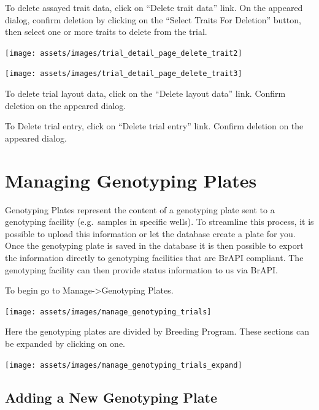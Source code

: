\documentclass[
  12pt,
]{book}
\begin{document}
To delete assayed trait data, click on ``Delete trait data'' link. On the appeared dialog, confirm deletion by clicking on the ``Select Traits For Deletion'' button, then select one or more traits to delete from the trial.

\begin{center}\texttt{[image: assets/images/trial\_detail\_page\_delete\_trait2]} \end{center}

\begin{center}\texttt{[image: assets/images/trial\_detail\_page\_delete\_trait3]} \end{center}

To delete trial layout data, click on the ``Delete layout data'' link. Confirm deletion on the appeared dialog.

To Delete trial entry, click on ``Delete trial entry'' link. Confirm deletion on the appeared dialog.

\hypertarget{managing-genotyping-plates}{%
\chapter{Managing Genotyping Plates}\label{managing-genotyping-plates}}

Genotyping Plates represent the content of a genotyping plate sent to a genotyping facility (e.g.~samples in specific wells). To streamline this process, it is possible to upload this information or let the database create a plate for you. Once the genotyping plate is saved in the database it is then possible to export the information directly to genotyping facilities that are BrAPI compliant. The genotyping facility can then provide status information to us via BrAPI.

To begin go to Manage-\textgreater Genotyping Plates.

\begin{center}\texttt{[image: assets/images/manage\_genotyping\_trials]} \end{center}

Here the genotyping plates are divided by Breeding Program. These sections can be expanded by clicking on one.

\begin{center}\texttt{[image: assets/images/manage\_genotyping\_trials\_expand]} \end{center}

\hypertarget{adding-a-new-genotyping-plate}{%
\section{Adding a New Genotyping Plate}\label{adding-a-new-genotyping-plate}}
\end{document}
